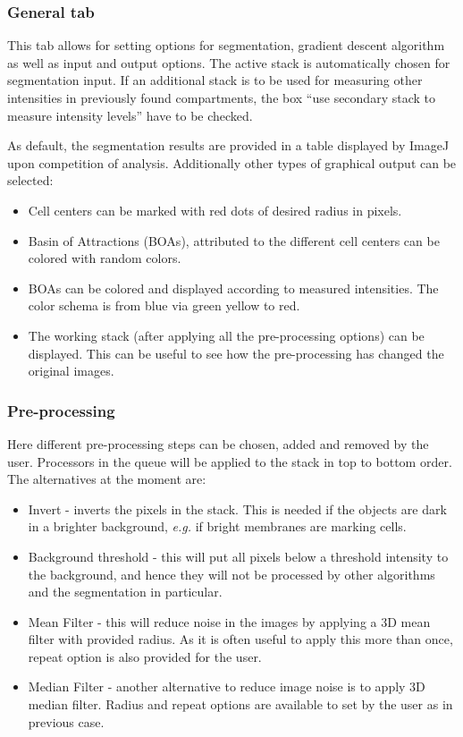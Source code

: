 \documentclass[a4paper,12pt]{article}
\begin{document}
\subsubsection{General tab}
This tab allows for setting options for segmentation, gradient descent algorithm as well as input and output options. The active
stack is automatically chosen for segmentation input. If an additional stack is to
be used for measuring other intensities in previously found compartments, the box ``use secondary stack to measure intensity levels'' have to be checked.

As default, the segmentation results are provided in a table displayed by
ImageJ upon competition of analysis. Additionally other types of graphical output can be selected:

\begin{itemize}
%
\item Cell centers can be marked with red dots of desired radius in pixels.
%
\item Basin of Attractions (BOAs), attributed to the different cell centers can be
	colored with random colors.
%
\item BOAs can be colored and displayed according to measured intensities. The color schema is from blue via green yellow to red.
%
\item The working stack (after applying all the pre-processing options) can be displayed. This can be useful to see how the
	pre-processing has changed the original images.
%
\end{itemize}

\subsubsection{Pre-processing}
Here different pre-processing steps can be chosen, added and removed by the
user. Processors in the queue will be applied to the stack in top to bottom order. The alternatives at the moment are:

\begin{itemize}
%
\item Invert - inverts the pixels in the stack. This is needed if the objects
	are dark in a brighter background, \textit{e.g.} if bright membranes are marking
	cells.
%
\item Background threshold - this will put all pixels below a threshold
	intensity to the background, and hence they will not be processed by other algorithms and 
	the segmentation in particular.
%
\item Mean Filter - this will reduce noise in the images by applying a 3D mean
	filter with provided radius. As it is often useful to apply this more than
	once, repeat option is also provided for the user.
%
\item Median Filter - another alternative to reduce image noise is to apply 3D median filter.
	Radius and repeat options are available to set by the user as in previous case.
%
\end{itemize}
\end{document}
